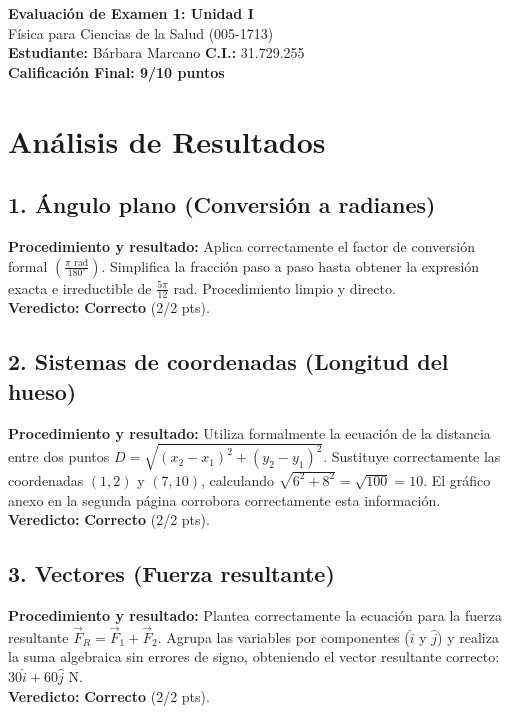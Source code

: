 \documentclass[12pt]{article}
\begin{document}
\begin{center}
    \Large \textbf{Evaluación de Examen 1: Unidad I} \\
    \large Física para Ciencias de la Salud (005-1713) \\
    \vspace{0.5cm}
    \textbf{Estudiante:} Bárbara Marcano \quad \textbf{C.I.:} 31.729.255
    \vspace{0.3cm} \\
    \large \textbf{Calificación Final: 9/10 puntos}
\end{center}

\vspace{0.5cm}

\section*{Análisis de Resultados}

\subsection*{1. Ángulo plano (Conversión a radianes)}
\textbf{Procedimiento y resultado:} Aplica correctamente el factor de conversión formal $\left(\frac{\pi \text{ rad}}{180^\circ}\right)$. Simplifica la fracción paso a paso hasta obtener la expresión exacta e irreductible de $\frac{5\pi}{12}$ rad. Procedimiento limpio y directo. \\
\textbf{Veredicto:} \textbf{Correcto} (2/2 pts).

\subsection*{2. Sistemas de coordenadas (Longitud del hueso)}
\textbf{Procedimiento y resultado:} Utiliza formalmente la ecuación de la distancia entre dos puntos $D = \sqrt{(x_2-x_1)^2 + (y_2-y_1)^2}$. Sustituye correctamente las coordenadas $(1,2)$ y $(7,10)$, calculando $\sqrt{6^2 + 8^2} = \sqrt{100} = 10$. El gráfico anexo en la segunda página corrobora correctamente esta información. \\
\textbf{Veredicto:} \textbf{Correcto} (2/2 pts).

\subsection*{3. Vectores (Fuerza resultante)}
\textbf{Procedimiento y resultado:} Plantea correctamente la ecuación para la fuerza resultante $\vec{F}_R = \vec{F}_1 + \vec{F}_2$. Agrupa las variables por componentes ($\hat{i}$ y $\hat{j}$) y realiza la suma algebraica sin errores de signo, obteniendo el vector resultante correcto: $30\hat{i} + 60\hat{j}$ N. \\
\textbf{Veredicto:} \textbf{Correcto} (2/2 pts).
\end{document}
